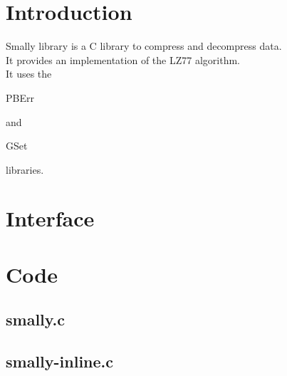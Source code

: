\section*{Introduction}

Smally library is a C library to compress and decompress data.\\

It provides an implementation of the LZ77 algorithm.\\

It uses the \begin{ttfamily}PBErr\end{ttfamily} and \begin{ttfamily}GSet\end{ttfamily} libraries.\\

\section{Interface}

\begin{scriptsize}
\begin{ttfamily}

\end{ttfamily}
\end{scriptsize}

\section{Code}

\subsection{smally.c}

\begin{scriptsize}
\begin{ttfamily}

\end{ttfamily}
\end{scriptsize}

\subsection{smally-inline.c}

\begin{scriptsize}
\begin{ttfamily}

\end{ttfamily}
\end{scriptsize}

